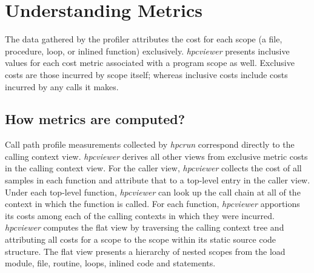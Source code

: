 \documentclass[a4paper,11pt]{article}
\begin{document}
\section{Understanding Metrics}

 The data gathered by the profiler attributes the cost for each scope (a file, procedure, loop, or inlined function) exclusively.  \textit{hpcviewer} presents inclusive values for each cost metric associated with a program scope as well.  Exclusive costs are those incurred by scope itself; whereas inclusive costs include costs incurred by  any calls it makes.  

\subsection{How metrics are computed?}

Call path profile measurements collected by \textit{hpcrun} correspond directly to the calling context view. \textit{hpcviewer}  derives all other views from exclusive metric costs in the calling context view. For the caller view, \textit{hpcviewer} collects the  cost of all samples in each function and attribute that to a top-level entry in the caller view. Under each top-level  function, \textit{hpcviewer} can look up the call chain at all of the context in which the function is called. For each function, \textit{hpcviewer}  apportions its costs among each of the calling contexts in which they were incurred. \textit{hpcviewer} computes the flat view by  traversing the calling context tree and attributing all costs for a scope to the scope within its static source code  structure. The flat view presents a hierarchy of nested scopes from the load module, file, routine, loops, inlined  code and statements.  
\end{document}
